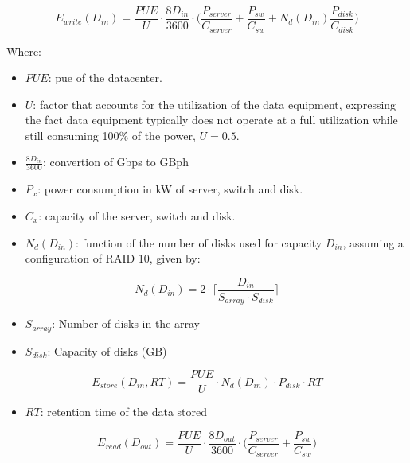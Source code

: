 \begin{equation}
\label{formula:tall_datacenter_write}
    E_{write}(D_{in}) = \frac{PUE}{U} \cdot \frac{8D_{in}}{3600} \cdot \bigg(\frac{P_{server}}{C_{server}} + \frac{P_{sw}}{C_{sw}} + N_d(D_{in}) \frac{P_{disk}}{C_{disk}}  \bigg) 
\end{equation}

Where:
\begin{itemize}
    \item $PUE$: \ac{pue} of the datacenter.
    \item $U$: factor that accounts for the utilization of the data equipment, expressing the fact data equipment typically does not operate at a full utilization while still consuming 100\% of the power, $U = 0.5$.
    \item $\frac{8D_{in}}{3600}$: convertion of Gbps to GBph
    \item $P_x$: power consumption in kW of server, switch and disk.
    \item $C_x$: capacity of the server, switch and disk.
    \item $N_d(D_{in})$: function of the number of disks used for capacity $D_{in}$, assuming a configuration of RAID 10, given by: 
\end{itemize}

\begin{equation}
\label{formula:tall_datacenter_ndisks}
    N_d(D_{in}) = 2 \cdot \bigg \lceil \frac{D_{in}}{S_{array} \cdot S_{disk}} \bigg \rceil
\end{equation}

\begin{itemize}
    \item $S_{array}$: Number of disks in the array
    \item $S_{disk}$: Capacity of disks (GB)
\end{itemize}

\begin{equation}
\label{formula:tall_datacenter_store}
    E_{store}(D_{in}, RT) = \frac{PUE}{U} \cdot N_d(D_{in}) \cdot P_{disk} \cdot RT
\end{equation}

\begin{itemize}
    \item $RT$: retention time of the data stored
\end{itemize}

\begin{equation}
\label{formula:tall_datacenter_read}
    E_{read}(D_{out}) = \frac{PUE}{U} \cdot \frac{8D_{out}}{3600} \cdot \bigg(\frac{P_{server}}{C_{server}} + \frac{P_{sw}}{C_{sw}}  \bigg)
\end{equation}

